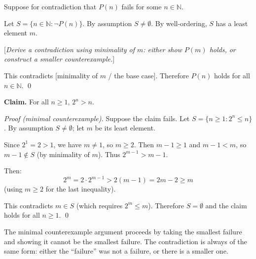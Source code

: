 \begin{tcolorbox}[colback=gray!4, colframe=gray!35, arc=2pt,
  left=6pt, right=6pt, top=4pt, bottom=4pt,
  title={\small\textbf{Template: Minimal Counterexample}},
  fonttitle=\small\bfseries]
Suppose for contradiction that $P(n)$ fails for some $n \in \mathbb{N}$.

Let $S = \{n \in \mathbb{N} : \neg P(n)\}$.
By assumption $S \neq \emptyset$.
By well-ordering, $S$ has a least element $m$.

[\emph{Derive a contradiction using minimality of $m$: either show
$P(m)$ holds, or construct a smaller counterexample.}]

This contradicts [minimality of $m$ / the base case].
Therefore $P(n)$ holds for all $n \in \mathbb{N}$. \qed
\end{tcolorbox}

\begin{example}
\textbf{Claim.} For all $n \geq 1$, $2^n > n$.

\medskip
\noindent\textit{Proof (minimal counterexample).}
Suppose the claim fails. Let $S = \{n \geq 1 : 2^n \leq n\}$.
By assumption $S \neq \emptyset$; let $m$ be its least element.

Since $2^1 = 2 > 1$, we have $m \neq 1$, so $m \geq 2$.
Then $m - 1 \geq 1$ and $m - 1 < m$, so $m - 1 \notin S$
(by minimality of $m$). Thus $2^{m-1} > m - 1$.

Then:
\[
2^m = 2 \cdot 2^{m-1} > 2(m-1) = 2m - 2 \geq m
\]
(using $m \geq 2$ for the last inequality).

This contradicts $m \in S$ (which requires $2^m \leq m$).
Therefore $S = \emptyset$ and the claim holds for all $n \geq 1$. \qed

\medskip
\noindent
The minimal counterexample argument proceeds by taking the smallest
failure and showing it cannot be the smallest failure. The contradiction
is always of the same form: either the ``failure'' was not a failure,
or there is a smaller one.
\end{example}
